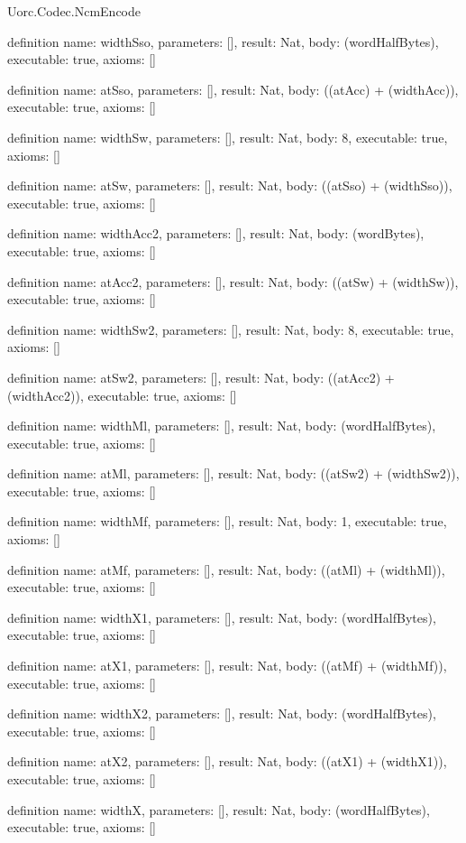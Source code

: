 \begin{lexlean}{Uorc.Codec.NcmEncode}
\begin{semanticmodule}
definition{
  name: widthSso,
  parameters: [],
  result: Nat,
  body: (wordHalfBytes),
  executable: true,
  axioms: []
}

definition{
  name: atSso,
  parameters: [],
  result: Nat,
  body: ((atAcc) + (widthAcc)),
  executable: true,
  axioms: []
}

definition{
  name: widthSw,
  parameters: [],
  result: Nat,
  body: 8,
  executable: true,
  axioms: []
}

definition{
  name: atSw,
  parameters: [],
  result: Nat,
  body: ((atSso) + (widthSso)),
  executable: true,
  axioms: []
}

definition{
  name: widthAcc2,
  parameters: [],
  result: Nat,
  body: (wordBytes),
  executable: true,
  axioms: []
}

definition{
  name: atAcc2,
  parameters: [],
  result: Nat,
  body: ((atSw) + (widthSw)),
  executable: true,
  axioms: []
}

definition{
  name: widthSw2,
  parameters: [],
  result: Nat,
  body: 8,
  executable: true,
  axioms: []
}

definition{
  name: atSw2,
  parameters: [],
  result: Nat,
  body: ((atAcc2) + (widthAcc2)),
  executable: true,
  axioms: []
}

definition{
  name: widthMl,
  parameters: [],
  result: Nat,
  body: (wordHalfBytes),
  executable: true,
  axioms: []
}

definition{
  name: atMl,
  parameters: [],
  result: Nat,
  body: ((atSw2) + (widthSw2)),
  executable: true,
  axioms: []
}

definition{
  name: widthMf,
  parameters: [],
  result: Nat,
  body: 1,
  executable: true,
  axioms: []
}

definition{
  name: atMf,
  parameters: [],
  result: Nat,
  body: ((atMl) + (widthMl)),
  executable: true,
  axioms: []
}

definition{
  name: widthX1,
  parameters: [],
  result: Nat,
  body: (wordHalfBytes),
  executable: true,
  axioms: []
}

definition{
  name: atX1,
  parameters: [],
  result: Nat,
  body: ((atMf) + (widthMf)),
  executable: true,
  axioms: []
}

definition{
  name: widthX2,
  parameters: [],
  result: Nat,
  body: (wordHalfBytes),
  executable: true,
  axioms: []
}

definition{
  name: atX2,
  parameters: [],
  result: Nat,
  body: ((atX1) + (widthX1)),
  executable: true,
  axioms: []
}

definition{
  name: widthX,
  parameters: [],
  result: Nat,
  body: (wordHalfBytes),
  executable: true,
  axioms: []
}


\end{semanticmodule}
\end{lexlean}
